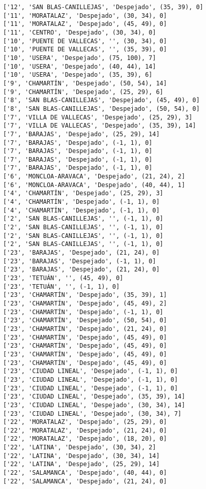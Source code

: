 \documentclass[11pt]{article}
\begin{document}
\begin{Verbatim}[commandchars=\\\{\}]
['12', 'SAN BLAS-CANILLEJAS', 'Despejado', (35, 39), 0]
['11', 'MORATALAZ', 'Despejado', (30, 34), 0]
['11', 'MORATALAZ', 'Despejado', (45, 49), 0]
['11', 'CENTRO', 'Despejado', (30, 34), 0]
['10', 'PUENTE DE VALLECAS', '', (30, 34), 0]
['10', 'PUENTE DE VALLECAS', '', (35, 39), 0]
['10', 'USERA', 'Despejado', (75, 100), 7]
['10', 'USERA', 'Despejado', (40, 44), 14]
['10', 'USERA', 'Despejado', (35, 39), 6]
['9', 'CHAMARTÍN', 'Despejado', (50, 54), 14]
['9', 'CHAMARTÍN', 'Despejado', (25, 29), 6]
['8', 'SAN BLAS-CANILLEJAS', 'Despejado', (45, 49), 0]
['8', 'SAN BLAS-CANILLEJAS', 'Despejado', (50, 54), 0]
['7', 'VILLA DE VALLECAS', 'Despejado', (25, 29), 3]
['7', 'VILLA DE VALLECAS', 'Despejado', (35, 39), 14]
['7', 'BARAJAS', 'Despejado', (25, 29), 14]
['7', 'BARAJAS', 'Despejado', (-1, 1), 0]
['7', 'BARAJAS', 'Despejado', (-1, 1), 0]
['7', 'BARAJAS', 'Despejado', (-1, 1), 0]
['7', 'BARAJAS', 'Despejado', (-1, 1), 0]
['6', 'MONCLOA-ARAVACA', 'Despejado', (21, 24), 2]
['6', 'MONCLOA-ARAVACA', 'Despejado', (40, 44), 1]
['4', 'CHAMARTÍN', 'Despejado', (25, 29), 3]
['4', 'CHAMARTÍN', 'Despejado', (-1, 1), 0]
['4', 'CHAMARTÍN', 'Despejado', (-1, 1), 0]
['2', 'SAN BLAS-CANILLEJAS', '', (-1, 1), 0]
['2', 'SAN BLAS-CANILLEJAS', '', (-1, 1), 0]
['2', 'SAN BLAS-CANILLEJAS', '', (-1, 1), 0]
['2', 'SAN BLAS-CANILLEJAS', '', (-1, 1), 0]
['23', 'BARAJAS', 'Despejado', (21, 24), 0]
['23', 'BARAJAS', 'Despejado', (-1, 1), 0]
['23', 'BARAJAS', 'Despejado', (21, 24), 0]
['23', 'TETUÁN', '', (45, 49), 0]
['23', 'TETUÁN', '', (-1, 1), 0]
['23', 'CHAMARTÍN', 'Despejado', (35, 39), 1]
['23', 'CHAMARTÍN', 'Despejado', (45, 49), 2]
['23', 'CHAMARTÍN', 'Despejado', (-1, 1), 0]
['23', 'CHAMARTÍN', 'Despejado', (50, 54), 0]
['23', 'CHAMARTÍN', 'Despejado', (21, 24), 0]
['23', 'CHAMARTÍN', 'Despejado', (45, 49), 0]
['23', 'CHAMARTÍN', 'Despejado', (45, 49), 0]
['23', 'CHAMARTÍN', 'Despejado', (45, 49), 0]
['23', 'CHAMARTÍN', 'Despejado', (45, 49), 0]
['23', 'CIUDAD LINEAL', 'Despejado', (-1, 1), 0]
['23', 'CIUDAD LINEAL', 'Despejado', (-1, 1), 0]
['23', 'CIUDAD LINEAL', 'Despejado', (-1, 1), 0]
['23', 'CIUDAD LINEAL', 'Despejado', (35, 39), 14]
['23', 'CIUDAD LINEAL', 'Despejado', (30, 34), 14]
['23', 'CIUDAD LINEAL', 'Despejado', (30, 34), 7]
['22', 'MORATALAZ', 'Despejado', (25, 29), 0]
['22', 'MORATALAZ', 'Despejado', (21, 24), 0]
['22', 'MORATALAZ', 'Despejado', (18, 20), 0]
['22', 'LATINA', 'Despejado', (30, 34), 2]
['22', 'LATINA', 'Despejado', (30, 34), 14]
['22', 'LATINA', 'Despejado', (25, 29), 14]
['22', 'SALAMANCA', 'Despejado', (40, 44), 0]
['22', 'SALAMANCA', 'Despejado', (21, 24), 0]

\end{Verbatim}
\end{document}
